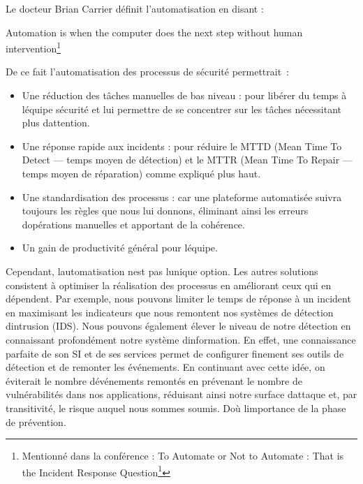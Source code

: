 \documentclass[
  11pt,
  a4paper,
  krantz2,
  11pt,
  oneside]{krantz}
\renewenvironment{quote}{\begin{VF}}{\end{VF}}
\renewcommand{\href}[2]{#2\footnote{\url{#1}}}
\begin{document}
Le docteur Brian Carrier définit l'automatisation en disant :

\begin{quote}
Automation is when the computer does the next step without human intervention\footnote{Mentionné dans la conférence : \href{https://www.youtube.com/watch?v=P1ghXLKb_1Y}{To Automate or Not to Automate : That is the Incident Response Question}}
\end{quote}

De ce fait l'automatisation des processus de sécurité permettrait~:

\begin{itemize}
\item
  Une réduction des tâches manuelles de bas niveau : pour libérer du temps à l\textquotesingle équipe sécurité et lui permettre de se concentrer sur les tâches nécessitant plus d\textquotesingle attention.
\item
  Une réponse rapide aux incidents : pour réduire le MTTD (Mean Time To Detect --- temps moyen de détection) et le MTTR (Mean Time To Repair --- temps moyen de réparation) comme expliqué plus haut.
\item
  Une standardisation des processus : car une plateforme automatisée suivra toujours les règles que nous lui donnons, éliminant ainsi les erreurs d\textquotesingle opérations manuelles et apportant de la cohérence.
\item
  Un gain de productivité général pour l\textquotesingle équipe.
\end{itemize}

Cependant, l\textquotesingle automatisation n\textquotesingle est pas l\textquotesingle unique option. Les autres solutions consistent à optimiser la réalisation des processus en améliorant ceux qui en dépendent. Par exemple, nous pouvons limiter le temps de réponse à un incident en maximisant les indicateurs que nous remontent nos systèmes de détection d\textquotesingle intrusion (IDS). Nous pouvons également élever le niveau de notre détection en connaissant profondément notre système d\textquotesingle information. En effet, une connaissance parfaite de son SI et de ses services permet de configurer finement ses outils de détection et de remonter les événements. En continuant avec cette idée, on éviterait le nombre d\textquotesingle événements remontés en prévenant le nombre de vulnérabilités dans nos applications, réduisant ainsi notre surface d\textquotesingle attaque et, par transitivité, le risque auquel nous sommes soumis. D\textquotesingle où l\textquotesingle importance de la phase de prévention.
\end{document}
